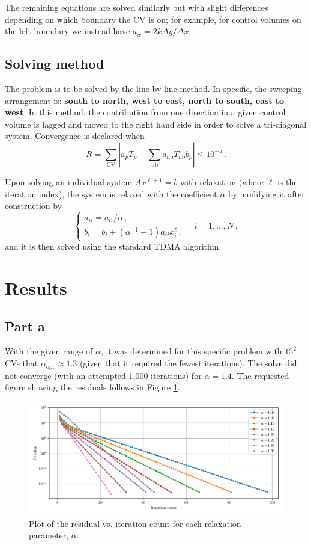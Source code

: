 \documentclass{article}
\begin{document}
The remaining equations are solved similarly but with slight differences depending on which boundary the CV is on; for example, for control volumes on the left boundary we instead have $a_w = 2 k \Delta y / \Delta x$.

\subsection*{Solving method}

The problem is to be solved by the line-by-line method. In specific, the sweeping arrangement is: \textbf{south to north, west to east, north to south, east to west}. In this method, the contribution from one direction in a given control volume is lagged and moved to the right hand side in order to solve a tri-diagonal system. Convergence is declared when
\begin{equation}
	R = \sum_\text{CV} \left| a_p T_p - \sum_{\text{nb}} a_\text{nb} T_\text{nb} b_p\right|\leq 10^{-5}\,.
\end{equation}

Upon solving an individual system $Ax^{\ell + 1} = b$ with relaxation (where $\ell$ is the iteration index), the system is relaxed with the coefficient $\alpha$ by modifying it after construction by
\[
	\begin{cases}
		a_{ii} = a_{ii} / \alpha\,,\\
		b_i = b_i + (\alpha^{-1} - 1) a_{ii} x_i^\ell\,,
	\end{cases} \quad i = 1, \ldots, N\,,
\]
and it is then solved using the standard TDMA algorithm.

\section*{Results}

\subsection*{Part a}

With the given range of $\alpha$, it was determined for this specific problem with $15^2$ CVs that $\alpha_\text{opt} \approx 1.3$ (given that it required the fewest iterations). The solve did not converge (with an attempted 1,000 iterations) for $\alpha = 1.4$. The requested figure showing the residuals follows in Figure \ref{fig:a}.

\begin{figure}[H]
	\centering
	\includegraphics[width=\linewidth]{../results/a}
	\caption{Plot of the residual vs. iteration count for each relaxation parameter, $\alpha$.}
	\label{fig:a}
\end{figure}
\end{document}
